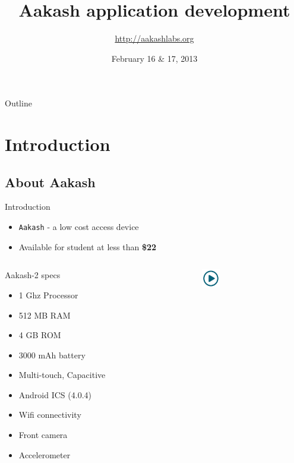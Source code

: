 \documentclass{beamer}
\title[Aakash application development]{Aakash application development}
\author{\url{http://aakashlabs.org}}
\institute{Indian Institute of Technology, Bombay}
\date{February 16 \& 17, 2013}
\begin{document}
\begin{frame}
  \titlepage
\end{frame}
\begin{frame}{Outline}
 \tableofcontents
\end{frame}
\section{Introduction}
\subsection{About Aakash}
\begin{frame}{Introduction}
\begin{itemize}
  \item {\tt Aakash} - a low cost access device
  \item Available for student at less than {\bf \$22}
\end{itemize}
\begin{columns}
\begin{column}{.48\textwidth}
\begin{block}{Aakash-2 specs}
\begin{itemize}
  \item 1 Ghz Processor
  \item 512 MB RAM
  \item 4 GB ROM
  \item 3000 mAh battery
  \item Multi-touch, Capacitive
  \item Android ICS (4.0.4) 
  \item Wifi connectivity
  \item Front camera
  \item Accelerometer
\end{itemize}
\end{block}
\end{column}%
\begin{column}{.20\textwidth}
  \centerline{\href{file:///home/sachin/github/slides/scipy2012/android_app.3gp}{\includegraphics[height=0.8cm,width=0.8cm]{play.jpg}}}
\end{column}%
\end{columns}
\end{frame}
\end{document}
